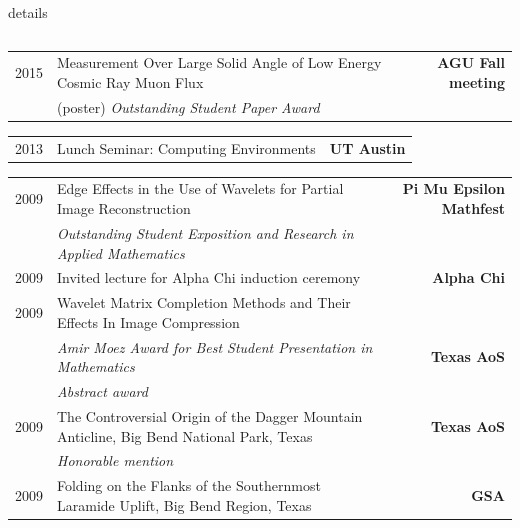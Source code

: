 \documentclass[10pt,letterpaper]{moderncv}
\begin{document}
\begin{taggedblock}{details}
\begin{tabularx}{\textwidth}{p{.33in}>{\raggedright\arraybackslash}X>{\bfseries}r}
\end{tabularx}

\begin{tabularx}{\textwidth}{p{.33in}>{\raggedright\arraybackslash}X>{\bfseries}r}
    2015 & Measurement Over Large Solid Angle of Low Energy Cosmic Ray Muon Flux &  AGU Fall meeting \\
     & (poster) \emph{Outstanding Student Paper Award} & \\
\end{tabularx}

\begin{tabularx}{\textwidth}{p{.33in}>{\raggedright\arraybackslash}X>{\bfseries}r}
     2013 & Lunch Seminar: Computing Environments & UT Austin \\
\end{tabularx}

\begin{tabularx}{\textwidth}{p{.33in}>{\raggedright\arraybackslash}X>{\bfseries}r}
     2009 & Edge Effects in the Use of Wavelets for Partial Image Reconstruction & Pi Mu Epsilon Mathfest \\
     & \emph{Outstanding Student Exposition and Research in Applied Mathematics} & \\

     2009 & Invited lecture for Alpha Chi induction ceremony & Alpha Chi  \\

     2009 & Wavelet Matrix Completion Methods and Their Effects In Image Compression &  \\
      & \emph{Amir Moez Award for Best Student Presentation in Mathematics} & Texas AoS \\
      & \emph{Abstract award} & \\

      2009 & The Controversial Origin of the Dagger Mountain Anticline, Big Bend National Park, Texas &  Texas AoS \\
      & \emph{Honorable mention} & \\


      2009 & Folding on the Flanks of the Southernmost Laramide Uplift, Big Bend Region, Texas & GSA \\



\end{tabularx}
\end{taggedblock}
\end{document}
